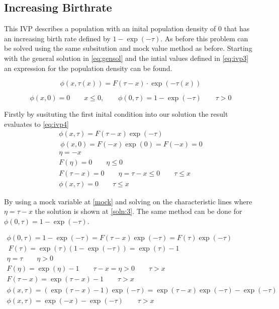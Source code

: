 \documentclass[paper=a4, fontsize=11pt]{scrartcl} %
\numberwithin{equation}{section} %
\numberwithin{figure}{section} %
\numberwithin{table}{section} %
\begin{document}
\subsection{Increasing Birthrate}
This IVP describes a population with an inital population density of 0 that has an increasing birth rate defined by $1-\exp(-\tau)$. As before this problem can be solved using the same subsitution and mock value method as before. Starting with the general solution in \ref{eq:gensol} and the intial values defined in \ref{eq:ivp3} an expression for the population density can be found.

\begin{equation} \label{eq:gensol}
	\phi(x, \tau(x)) = F(\tau-x)\cdot\exp(-\tau(x))
\end{equation}

\begin{equation} \label{eq:ivp3}
	\phi(x,0) = 0 \qquad x \le 0, \qquad \phi(0,\tau)=1-\exp(-\tau) \qquad \tau > 0
\end{equation}

Firstly by susituting the first inital condition into our solution the result evaluates to \ref{eq:ivp4}
\begin{align} \label{eq:ivp4}
	\phi(x,\tau) = F(\tau-x)\exp(-\tau) \\
	~
	\phi(x,0) = F(-x)\exp(0) = F(-x) = 0 \\
	\eta = -x \label{mock}\\
	F(\eta) = 0 \qquad \eta \le 0 \\
	F(\tau-x)=0 \label{fn} \qquad \eta=\tau-x \le 0 \qquad \tau \le x\\
	\phi(x,\tau) = 0 \qquad \tau \le x \label{soln:3}
\end{align}

By using a mock variable at \ref{mock} and solving on the characteristic lines where $\eta  =\tau-x$ the solution is shown at \ref{soln:3}. The same method can be done for $\phi(0,\tau)=1-\exp(-\tau)$.

\begin{align}
	\phi(0, \tau) = 1-\exp(-\tau) = F(\tau-x)\exp(-\tau) = F(\tau)\exp(-\tau) \\
	~
	F(\tau) = \exp(\tau)(1-\exp(-\tau)) = \exp(\tau)-1 \\
	\eta = \tau \qquad \eta > 0\\
	F(\eta) = \exp(\eta)-1 \qquad \tau-x = \eta > 0 \qquad \tau > x\\
	F(\tau-x) = \exp(\tau-x)-1 \qquad \tau >x\\
	\phi(x,\tau)=(\exp(\tau-x)-1)\exp(-\tau) = \exp(\tau-x)\exp(-\tau)-\exp(-\tau)\\
	\phi(x,\tau)=\exp(-x)-\exp(-\tau) \qquad \tau >x
\end{align}
\end{document}

